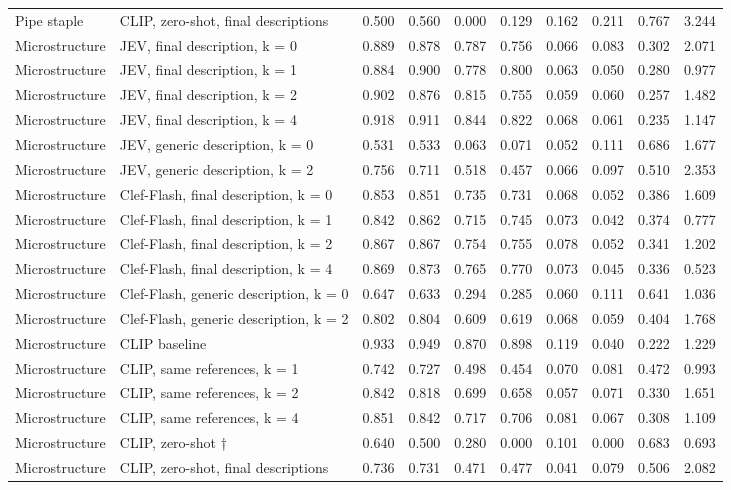\begin{table}
\begin{tabular}[t]{llrrrrrrrr}
Pipe staple & CLIP, zero-shot, final descriptions & 0.500 & 0.560 & 0.000 & 0.129 & 0.162 & 0.211 & 0.767 & 3.244\\
Microstructure & JEV, final description, k = 0 & 0.889 & 0.878 & 0.787 & 0.756 & 0.066 & 0.083 & 0.302 & 2.071\\
Microstructure & JEV, final description, k = 1 & 0.884 & 0.900 & 0.778 & 0.800 & 0.063 & 0.050 & 0.280 & 0.977\\
Microstructure & JEV, final description, k = 2 & 0.902 & 0.876 & 0.815 & 0.755 & 0.059 & 0.060 & 0.257 & 1.482\\
\addlinespace
Microstructure & JEV, final description, k = 4 & 0.918 & 0.911 & 0.844 & 0.822 & 0.068 & 0.061 & 0.235 & 1.147\\
Microstructure & JEV, generic description, k = 0 & 0.531 & 0.533 & 0.063 & 0.071 & 0.052 & 0.111 & 0.686 & 1.677\\
Microstructure & JEV, generic description, k = 2 & 0.756 & 0.711 & 0.518 & 0.457 & 0.066 & 0.097 & 0.510 & 2.353\\
Microstructure & Clef-Flash, final description, k = 0 & 0.853 & 0.851 & 0.735 & 0.731 & 0.068 & 0.052 & 0.386 & 1.609\\
Microstructure & Clef-Flash, final description, k = 1 & 0.842 & 0.862 & 0.715 & 0.745 & 0.073 & 0.042 & 0.374 & 0.777\\
\addlinespace
Microstructure & Clef-Flash, final description, k = 2 & 0.867 & 0.867 & 0.754 & 0.755 & 0.078 & 0.052 & 0.341 & 1.202\\
Microstructure & Clef-Flash, final description, k = 4 & 0.869 & 0.873 & 0.765 & 0.770 & 0.073 & 0.045 & 0.336 & 0.523\\
Microstructure & Clef-Flash, generic description, k = 0 & 0.647 & 0.633 & 0.294 & 0.285 & 0.060 & 0.111 & 0.641 & 1.036\\
Microstructure & Clef-Flash, generic description, k = 2 & 0.802 & 0.804 & 0.609 & 0.619 & 0.068 & 0.059 & 0.404 & 1.768\\
Microstructure & CLIP baseline & 0.933 & 0.949 & 0.870 & 0.898 & 0.119 & 0.040 & 0.222 & 1.229\\
\addlinespace
Microstructure & CLIP, same references, k = 1 & 0.742 & 0.727 & 0.498 & 0.454 & 0.070 & 0.081 & 0.472 & 0.993\\
Microstructure & CLIP, same references, k = 2 & 0.842 & 0.818 & 0.699 & 0.658 & 0.057 & 0.071 & 0.330 & 1.651\\
Microstructure & CLIP, same references, k = 4 & 0.851 & 0.842 & 0.717 & 0.706 & 0.081 & 0.067 & 0.308 & 1.109\\
Microstructure & CLIP, zero-shot † & 0.640 & 0.500 & 0.280 & 0.000 & 0.101 & 0.000 & 0.683 & 0.693\\
Microstructure & CLIP, zero-shot, final descriptions & 0.736 & 0.731 & 0.471 & 0.477 & 0.041 & 0.079 & 0.506 & 2.082\\
\bottomrule
\end{tabular}
\end{table}

